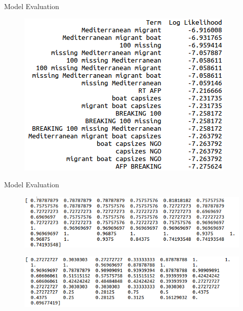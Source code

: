 \documentclass{beamer}
\begin{document}
\begin{frame}{Model Evaluation}

\begin{figure}
\centering

\includegraphics[scale=0.5]{nbterms.png}
\label{naivebayes}


\end{figure}

\end{frame}

\begin{frame}{Model Evaluation}

\begin{figure}
\centering

\includegraphics[scale=0.5]{naivebayesscores.png}
\label{naivebayes}

\includegraphics[scale=0.5]{naivebayesnoprior.png}
\label{naivebayes}


\end{figure}

\end{frame}
\end{document}
